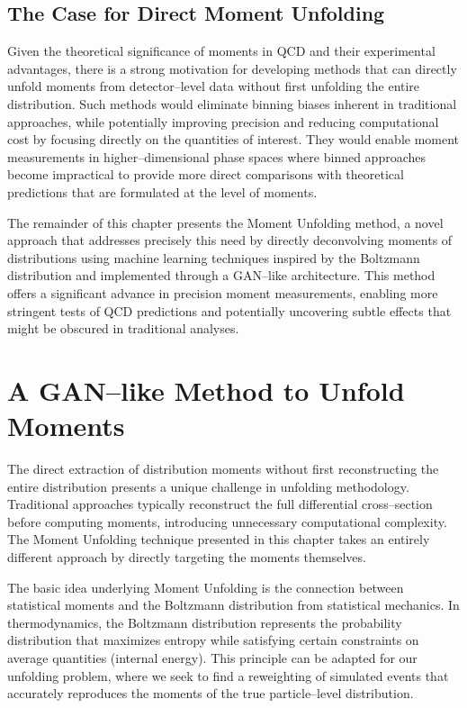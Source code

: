     \subsection{The Case for Direct Moment Unfolding}
        Given the theoretical significance of moments in QCD and their experimental advantages, there is a strong motivation for developing methods that can directly unfold moments from detector--level data without first unfolding the entire distribution.
        Such methods would eliminate binning biases inherent in traditional approaches, while potentially improving precision and reducing computational cost by focusing directly on the quantities of interest.
        They would enable moment measurements in higher--dimensional phase spaces where binned approaches become impractical to provide more direct comparisons with theoretical predictions that are formulated at the level of moments.

        The remainder of this chapter presents the Moment Unfolding method, a novel approach that addresses precisely this need by directly deconvolving moments of distributions using machine learning techniques inspired by the Boltzmann distribution and implemented through a GAN--like architecture.
        This method offers a significant advance in precision moment measurements, enabling more stringent tests of QCD predictions and potentially uncovering subtle effects that might be obscured in traditional analyses.
\section{A GAN--like Method to Unfold Moments}
    The direct extraction of distribution moments without first reconstructing the entire distribution presents a unique challenge in unfolding methodology.
    Traditional approaches typically reconstruct the full differential cross--section before computing moments, introducing unnecessary computational complexity.
    The Moment Unfolding technique presented in this chapter takes an entirely different approach by directly targeting the moments themselves.

    The basic idea underlying Moment Unfolding is the connection between statistical moments and the Boltzmann distribution from statistical mechanics.
    In thermodynamics, the Boltzmann distribution represents the probability distribution that maximizes entropy while satisfying certain constraints on average quantities (internal energy). 
    This principle can be adapted for our unfolding problem, where we seek to find a reweighting of simulated events that accurately reproduces the moments of the true particle--level distribution.
